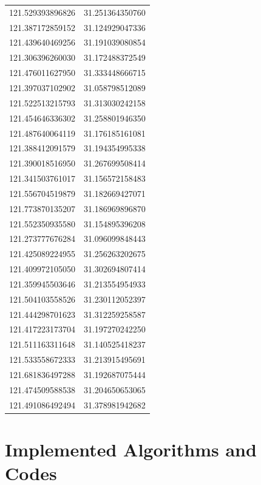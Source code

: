 \documentclass{mcmthesis}
\begin{document}
\begin{appendices}
\begin{table}[htbp]
\begin{tabular}{|c|c|}
    121.529393896826  & 31.251364350760  \\
    121.387172859152  & 31.124929047336  \\
    121.439640469256  & 31.191039080854  \\
    121.306396260030  & 31.172488372549  \\
    121.476011627950  & 31.333448666715  \\
    121.397037102902  & 31.058798512089  \\
    121.522513215793  & 31.313030242158  \\
    121.454646336302  & 31.258801946350  \\
    121.487640064119  & 31.176185161081  \\
    121.388412091579  & 31.194354995338  \\
    121.390018516950  & 31.267699508414  \\
    121.341503761017  & 31.156572158483  \\
    121.556704519879  & 31.182669427071  \\
    121.773870135207  & 31.186969896870  \\
    121.552350935580  & 31.154895396208  \\
    121.273777676284  & 31.096099848443  \\
    121.425089224955  & 31.256263202675  \\
    121.409972105050  & 31.302694807414  \\
    121.359945503646  & 31.213554954933  \\
    121.504103558526  & 31.230112052397  \\
    121.444298701623  & 31.312259258587  \\
    121.417223173704  & 31.197270242250  \\
    121.511163311648  & 31.140525418237  \\
    121.533558672333  & 31.213915495691  \\
    121.681836497288  & 31.192687075444  \\
    121.474509588538  & 31.204650653065  \\
    121.491086492494  & 31.378981942682  \\
    \hline
    \end{tabular}%
  \label{tab:addlabel}%
\end{table}%

\newpage
\section{Implemented Algorithms and Codes}

\end{appendices}
\end{document}

